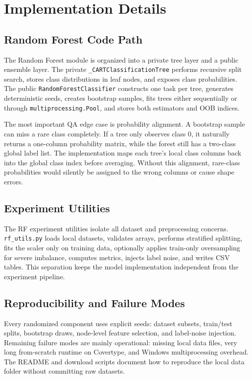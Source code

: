 \documentclass[11pt,twocolumn]{article}
\begin{document}
\section{Implementation Details}
\subsection{Random Forest Code Path}
The Random Forest module is organized into a private tree layer and a public ensemble layer. The private \texttt{\_CARTClassificationTree} performs recursive split search, stores class distributions in leaf nodes, and exposes class probabilities. The public \texttt{RandomForestClassifier} constructs one task per tree, generates deterministic seeds, creates bootstrap samples, fits trees either sequentially or through \texttt{multiprocessing.Pool}, and stores both estimators and OOB indices.

The most important QA edge case is probability alignment. A bootstrap sample can miss a rare class completely. If a tree only observes class 0, it naturally returns a one-column probability matrix, while the forest still has a two-class global label list. The implementation maps each tree's local class columns back into the global class index before averaging. Without this alignment, rare-class probabilities would silently be assigned to the wrong columns or cause shape errors.

\subsection{Experiment Utilities}
The RF experiment utilities isolate all dataset and preprocessing concerns. \texttt{rf\_utils.py} loads local datasets, validates arrays, performs stratified splitting, fits the scaler only on training data, optionally applies train-only oversampling for severe imbalance, computes metrics, injects label noise, and writes CSV tables. This separation keeps the model implementation independent from the experiment pipeline.

\subsection{Reproducibility and Failure Modes}
Every randomized component uses explicit seeds: dataset subsets, train/test splits, bootstrap draws, node-level feature selection, and label-noise injection. Remaining failure modes are mainly operational: missing local data files, very long from-scratch runtime on Covertype, and Windows multiprocessing overhead. The README and download scripts document how to reproduce the local data folder without committing raw datasets.
\end{document}
